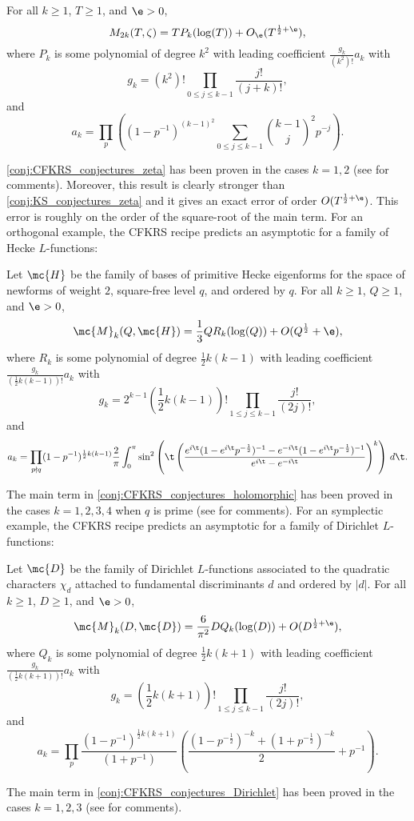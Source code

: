   \begin{conjecture}\label{conj:CFKRS_conjectures_zeta}
    For all $k \ge 1$, $T \ge 1$, and $\e > 0$,
    \[
      M_{2k}(T,\zeta) = TP_{k}(\log(T))+O_{\e}(T^{\frac{1}{2}+\e}),
    \]
    where $P_{k}$ is some polynomial of degree $k^{2}$ with leading coefficient $\frac{g_{k}}{(k^{2})!}a_{k}$ with
    \[
      g_{k} = (k^{2})!\prod_{0 \le j \le k-1}\frac{j!}{(j+k)!},
    \]
    and
    \[
      a_{k} = \prod_{p}\left((1-p^{-1})^{(k-1)^{2}}\sum_{0 \le j \le k-1}\binom{k-1}{j}^{2}p^{-j}\right).
    \]
  \end{conjecture}

  \cref{conj:CFKRS_conjectures_zeta} has been proven in the cases $k = 1,2$ (see \cite{conrey2005integral} for comments). Moreover, this result is clearly stronger than \cref{conj:KS_conjectures_zeta} and it gives an exact error of order $O(T^{\frac{1}{2}+\e})$. This error is roughly on the order of the square-root of the main term. For an orthogonal example, the CFKRS recipe predicts an asymptotic for a family of Hecke $L$-functions:

  \begin{conjecture}\label{conj:CFKRS_conjectures_holomorphic}
    Let $\mc{H}$ be the family of bases of primitive Hecke eigenforms for the space of newforms of weight $2$, square-free level $q$, and ordered by $q$. For all $k \ge 1$, $Q \ge 1$, and $\e > 0$,
    \[
      \mc{M}_{k}(Q,\mc{H}) = \frac{1}{3}QR_{k}(\log(Q))+O(Q^{\frac{1}{2}}+\e),
    \]
    where $R_{k}$ is some polynomial of degree $\frac{1}{2}k(k-1)$ with leading coefficient $\frac{g_{k}}{\left(\frac{1}{2}k(k-1)\right)!}a_{k}$ with
    \[
      g_{k} = 2^{k-1}\left(\frac{1}{2}k(k-1)\right)!\prod_{1 \le j \le k-1}\frac{j!}{(2j)!},
    \]
    and
    \[
      a_{k} = \prod_{p \nmid q}(1-p^{-1})^{\frac{1}{2}k(k-1)}\frac{2}{\pi}\int_{0}^{\pi}\sin^{2}\left(\t\left(\frac{e^{i\t}(1-e^{i\t}p^{-\frac{1}{2}})^{-1}-e^{-i\t}(1-e^{i\t}p^{-\frac{1}{2}})^{-1}}{e^{i\t}-e^{-i\t}}\right)^{k}\right)\,d\t.
    \]
  \end{conjecture}

  The main term in \cref{conj:CFKRS_conjectures_holomorphic} has been proved in the cases $k = 1,2,3,4$ when $q$ is prime (see \cite{conrey2005integral} for comments). For an symplectic example, the CFKRS recipe predicts an asymptotic for a family of Dirichlet $L$-functions:

  \begin{conjecture}\label{conj:CFKRS_conjectures_Dirichlet}
    Let $\mc{D}$ be the family of Dirichlet $L$-functions associated to the quadratic characters $\chi_{d}$ attached to fundamental discriminants $d$ and ordered by $|d|$. For all $k \ge 1$, $D \ge 1$, and $\e > 0$,
    \[
      \mc{M}_{k}(D,\mc{D}) = \frac{6}{\pi^{2}}DQ_{k}(\log(D))+O(D^{\frac{1}{2}+\e}),
    \]
    where $Q_{k}$ is some polynomial of degree $\frac{1}{2}k(k+1)$ with leading coefficient $\frac{g_{k}}{\left(\frac{1}{2}k(k+1)\right)!}a_{k}$ with
    \[
      g_{k} = \left(\frac{1}{2}k(k+1)\right)!\prod_{1 \le j \le k-1}\frac{j!}{(2j)!},
    \]
    and
    \[
      a_{k} = \prod_{p}\frac{(1-p^{-1})^{\frac{1}{2}k(k+1)}}{(1+p^{-1})}\left(\frac{(1-p^{-\frac{1}{2}})^{-k}+(1+p^{-\frac{1}{2}})^{-k}}{2}+p^{-1}\right).
    \]
  \end{conjecture}

  The main term in \cref{conj:CFKRS_conjectures_Dirichlet} has been proved in the cases $k = 1,2,3$ (see \cite{conrey2005integral} for comments).